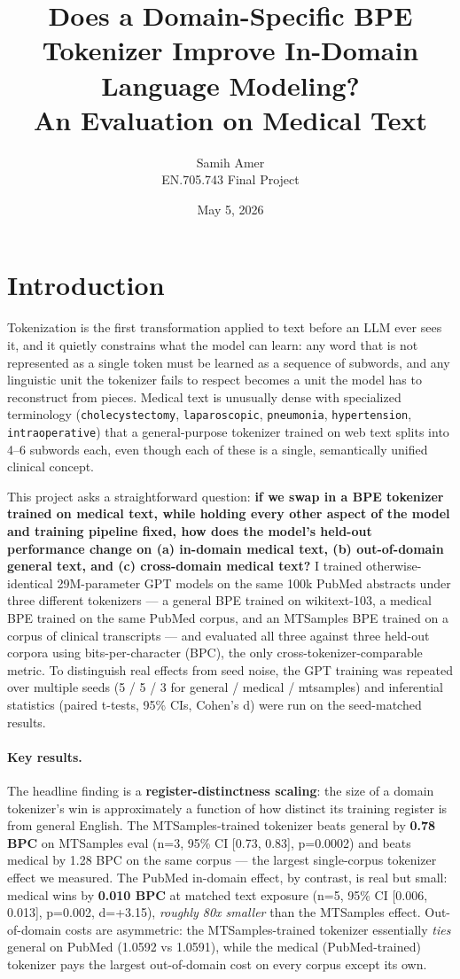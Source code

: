 \documentclass[11pt]{article}
\title{Does a Domain-Specific BPE Tokenizer Improve In-Domain Language Modeling?\\
\large An Evaluation on Medical Text}
\author{Samih Amer \\ \small EN.705.743 Final Project}
\date{May 5, 2026}
\begin{document}
\maketitle

\section{Introduction}

Tokenization is the first transformation applied to text before an LLM ever sees it, and it quietly constrains what the model can learn: any word that is not represented as a single token must be learned as a sequence of subwords, and any linguistic unit the tokenizer fails to respect becomes a unit the model has to reconstruct from pieces. Medical text is unusually dense with specialized terminology (\texttt{cholecystectomy}, \texttt{laparoscopic}, \texttt{pneumonia}, \texttt{hypertension}, \texttt{intraoperative}) that a general-purpose tokenizer trained on web text splits into 4--6 subwords each, even though each of these is a single, semantically unified clinical concept.

This project asks a straightforward question: \textbf{if we swap in a BPE tokenizer trained on medical text, while holding every other aspect of the model and training pipeline fixed, how does the model's held-out performance change on (a) in-domain medical text, (b) out-of-domain general text, and (c) cross-domain medical text?} I trained otherwise-identical 29M-parameter GPT models on the same 100k PubMed abstracts under three different tokenizers --- a general BPE trained on wikitext-103, a medical BPE trained on the same PubMed corpus, and an MTSamples BPE trained on a corpus of clinical transcripts --- and evaluated all three against three held-out corpora using bits-per-character (BPC), the only cross-tokenizer-comparable metric. To distinguish real effects from seed noise, the GPT training was repeated over multiple seeds (5 / 5 / 3 for general / medical / mtsamples) and inferential statistics (paired t-tests, 95\% CIs, Cohen's d) were run on the seed-matched results.

\paragraph{Key results.} The headline finding is a \textbf{register-distinctness scaling}: the size of a domain tokenizer's win is approximately a function of how distinct its training register is from general English. The MTSamples-trained tokenizer beats general by \textbf{0.78 BPC} on MTSamples eval (n=3, 95\% CI [0.73, 0.83], p=0.0002) and beats medical by 1.28 BPC on the same corpus --- the largest single-corpus tokenizer effect we measured. The PubMed in-domain effect, by contrast, is real but small: medical wins by \textbf{0.010 BPC} at matched text exposure (n=5, 95\% CI [0.006, 0.013], p=0.002, d=+3.15), \emph{roughly 80x smaller} than the MTSamples effect. Out-of-domain costs are asymmetric: the MTSamples-trained tokenizer essentially \emph{ties} general on PubMed (1.0592 vs 1.0591), while the medical (PubMed-trained) tokenizer pays the largest out-of-domain cost on every corpus except its own.
\end{document}

